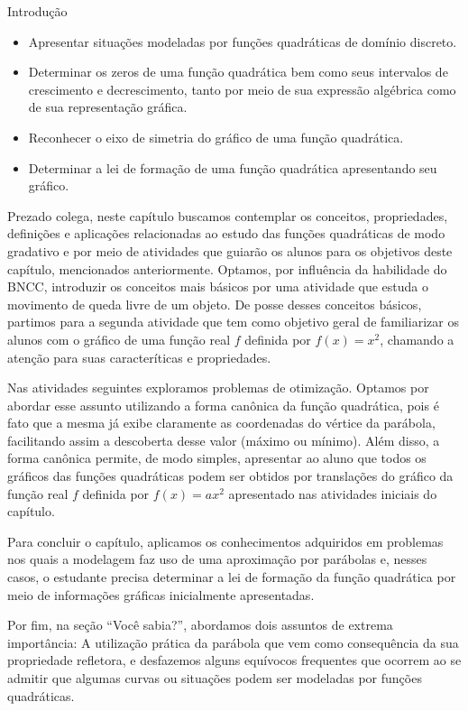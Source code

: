 \begin{apresentacao}{Introdução}
\begin{itemize}
\item {} 
Apresentar situações modeladas por funções quadráticas de domínio discreto.

\item {} 
Determinar os zeros de uma função quadrática bem como seus intervalos de crescimento e decrescimento, tanto por meio de sua expressão algébrica como de sua representação gráfica.

\item {} 
Reconhecer o eixo de simetria do gráfico de uma função quadrática.

\item {} 
Determinar a lei de formação de uma função quadrática apresentando seu gráfico.

\end{itemize}

Prezado colega, neste capítulo buscamos contemplar os conceitos, propriedades, definições e aplicações relacionadas ao estudo das funções quadráticas de modo gradativo e por meio de atividades que guiarão os alunos para os objetivos deste capítulo, mencionados anteriormente. Optamos, por influência da habilidade do BNCC, introduzir os conceitos mais básicos por uma atividade que estuda o movimento de queda livre de um objeto. De posse desses conceitos básicos, partimos para a segunda atividade que tem como objetivo geral de familiarizar os alunos com o gráfico de uma função real \(f\) definida por \(f(x)=x^2\), chamando a atenção para suas caracteríticas e propriedades.

Nas atividades seguintes exploramos problemas de otimização. Optamos por abordar esse assunto utilizando a forma canônica da função quadrática, pois é fato que a mesma já exibe claramente as coordenadas do vértice da parábola, facilitando assim a descoberta desse valor (máximo ou mínimo). Além disso, a forma canônica permite, de modo simples, apresentar ao aluno que todos os gráficos das funções quadráticas podem ser obtidos por translações do gráfico da função real \(f\) definida por \(f(x)=ax^2\) apresentado nas atividades iniciais do capítulo.

Para concluir o capítulo, aplicamos os conhecimentos adquiridos em problemas nos quais a modelagem faz uso de uma aproximação por parábolas e, nesses casos, o estudante precisa determinar a lei de formação da função quadrática por meio de informações gráficas inicialmente apresentadas.

Por fim, na seção “Você sabia?”, abordamos dois assuntos de extrema importância: A utilização prática da parábola que vem como consequência da sua propriedade refletora, e desfazemos alguns equívocos frequentes que ocorrem ao se admitir que algumas curvas ou situações podem ser modeladas por funções quadráticas.


\end{apresentacao}
